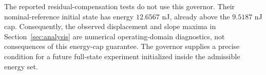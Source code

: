 The reported residual-compensation tests do not use this governor.
Their nominal-reference initial state has energy $12.6567$ nJ, already
above the $9.5187$ nJ cap.
Consequently, the observed displacement and slope maxima in
Section~\ref{sec:analysis} are numerical operating-domain diagnostics,
not consequences of this energy-cap guarantee. The governor supplies
a precise condition for a future full-state experiment initialized
inside the admissible energy set.
